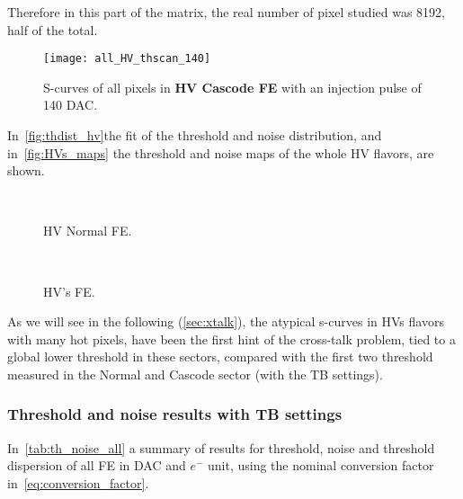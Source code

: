 Therefore in this part of the matrix, the real number of pixel studied was 8192, half of the total.


\begin{figure}[h!]
\centering
\texttt{[image: all\_HV\_thscan\_140]}
\caption{S-curves of all pixels in \textbf{HV Cascode FE} with an injection pulse of 140 DAC.}
\label{fig:hv_scurve_140}
\end{figure}

In~\autoref{fig:thdist_hv}the fit of the threshold and noise distribution, and in~\autoref{fig:HVs_maps} the threshold and noise maps of the whole HV flavors, are shown. 

\begin{figure}[h!]
\centering
{}\quad
{}\\
\caption{HV Normal FE.}
\label{fig:thdist_hv}
\end{figure}


\begin{figure}[h!]
\centering
{}\quad
{}\\
\caption{HV's FE.}
\label{fig:HVs_maps}
\end{figure}

As we will see in the following (\autoref{sec:xtalk}), the atypical s-curves in HVs flavors with many hot pixels, have been the first hint of the cross-talk problem, tied to a global lower threshold in these sectors, compared with the first two threshold measured in the Normal and Cascode sector (with the TB settings). 


\subsubsection{Threshold and noise results with TB settings}

In~\autoref{tab:th_noise_all} a summary of results for threshold, noise and threshold dispersion of all FE in DAC and $e^{-}$ unit, using the nominal conversion factor in~\autoref{eq:conversion_factor}.

